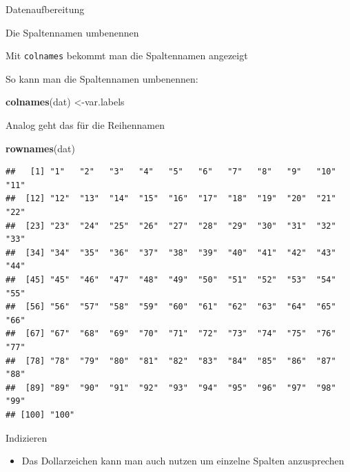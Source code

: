 \documentclass[ignorenonframetext,]{beamer}
\newenvironment{Shaded}{}{}
\newcommand{\KeywordTok}[1]{\textcolor[rgb]{0.00,0.44,0.13}{\textbf{{#1}}}}
\newcommand{\NormalTok}[1]{{#1}}
\providecommand{\tightlist}{%
\setlength{\itemsep}{0pt}\setlength{\parskip}{0pt}}
\begin{document}
\begin{frame}[fragile]{Datenaufbereitung}
\begin{block}{Die Spaltennamen umbenennen}
\begin{block}{Mit \texttt{colnames} bekommt man die Spaltennamen
angezeigt}
\end{block}

\begin{block}{So kann man die Spaltennamen umbenennen:}

\begin{Shaded}
\begin{Highlighting}[]
\KeywordTok{colnames}\NormalTok{(dat) <-var.labels}
\end{Highlighting}
\end{Shaded}

\end{block}

\begin{block}{Analog geht das für die Reihennamen}

\begin{Shaded}
\begin{Highlighting}[]
\KeywordTok{rownames}\NormalTok{(dat)}
\end{Highlighting}
\end{Shaded}

\begin{verbatim}
##   [1] "1"   "2"   "3"   "4"   "5"   "6"   "7"   "8"   "9"   "10"  "11" 
##  [12] "12"  "13"  "14"  "15"  "16"  "17"  "18"  "19"  "20"  "21"  "22" 
##  [23] "23"  "24"  "25"  "26"  "27"  "28"  "29"  "30"  "31"  "32"  "33" 
##  [34] "34"  "35"  "36"  "37"  "38"  "39"  "40"  "41"  "42"  "43"  "44" 
##  [45] "45"  "46"  "47"  "48"  "49"  "50"  "51"  "52"  "53"  "54"  "55" 
##  [56] "56"  "57"  "58"  "59"  "60"  "61"  "62"  "63"  "64"  "65"  "66" 
##  [67] "67"  "68"  "69"  "70"  "71"  "72"  "73"  "74"  "75"  "76"  "77" 
##  [78] "78"  "79"  "80"  "81"  "82"  "83"  "84"  "85"  "86"  "87"  "88" 
##  [89] "89"  "90"  "91"  "92"  "93"  "94"  "95"  "96"  "97"  "98"  "99" 
## [100] "100"
\end{verbatim}

\end{block}

\end{block}

\begin{block}{Indizieren}

\begin{itemize}
\tightlist
\item
  Das Dollarzeichen kann man auch nutzen um einzelne Spalten
  anzusprechen
\end{itemize}

\begin{Shaded}
\end{Shaded}


\end{block}
\end{frame}
\end{document}
